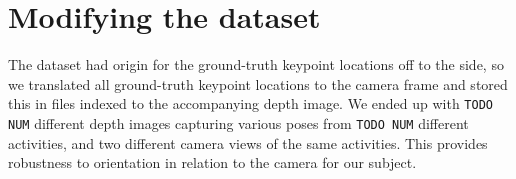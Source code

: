 \section{Modifying the dataset}

The dataset had origin for the ground-truth keypoint locations off to the side, so we translated all ground-truth keypoint locations to the camera frame and stored this in files indexed to the accompanying depth image. We ended up with \texttt{TODO NUM} different depth images capturing various poses from \texttt{TODO NUM} different activities, and two different camera views of the same activities. This provides robustness to orientation in relation to the camera for our subject.
